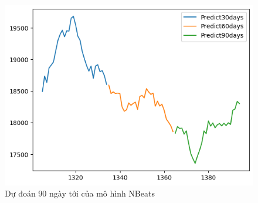 \begin{figure}[H]
\begin{minipage}{0.15\textwidth}
    \includegraphics[width=1\textwidth]{resources/chapter-5/newdata1/predicted/EIB_NBeats_9-1_30days.png}
    \end{minipage}
    \hfill
    
    \caption{Dự đoán 90 ngày tới của mô hình NBeats}
    \label{fig:NBeats_predicted}
\end{figure}

